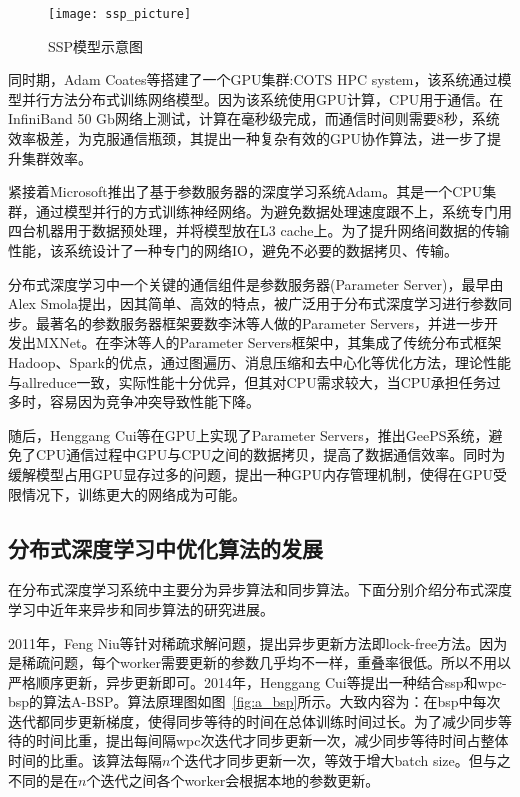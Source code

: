 \begin{figure}[htp]
\centering
\texttt{[image: ssp\_picture]}
\caption{SSP模型示意图}
\label{fig:ssp_picture}
\end{figure}
同时期，Adam Coates等搭建了一个GPU集群:COTS HPC system，该系统通过模型并行方法分布式训练网络模型。因为该系统使用GPU计算，CPU用于通信。在InfiniBand 50 Gb网络上测试，计算在毫秒级完成，而通信时间则需要8秒，系统效率极差，为克服通信瓶颈，其提出一种复杂有效的GPU协作算法，进一步了提升集群效率。

紧接着Microsoft推出了基于参数服务器的深度学习系统Adam。其是一个CPU集群，通过模型并行的方式训练神经网络。为避免数据处理速度跟不上，系统专门用四台机器用于数据预处理，并将模型放在L3 cache上。为了提升网络间数据的传输性能，该系统设计了一种专门的网络IO，避免不必要的数据拷贝、传输。

分布式深度学习中一个关键的通信组件是参数服务器(Parameter Server)，最早由Alex Smola提出，因其简单、高效的特点，被广泛用于分布式深度学习进行参数同步。最著名的参数服务器框架要数李沐等人做的Parameter Servers，并进一步开发出MXNet。在李沐等人的Parameter Servers框架中，其集成了传统分布式框架Hadoop、Spark的优点，通过图遍历、消息压缩和去中心化等优化方法，理论性能与allreduce一致，实际性能十分优异，但其对CPU需求较大，当CPU承担任务过多时，容易因为竞争冲突导致性能下降。

随后，Henggang Cui等在GPU上实现了Parameter Servers，推出GeePS系统，避免了CPU通信过程中GPU与CPU之间的数据拷贝，提高了数据通信效率。同时为缓解模型占用GPU显存过多的问题，提出一种GPU内存管理机制，使得在GPU受限情况下，训练更大的网络成为可能。
\subsection{分布式深度学习中优化算法的发展}
在分布式深度学习系统中主要分为异步算法和同步算法。下面分别介绍分布式深度学习中近年来异步和同步算法的研究进展。

2011年，Feng Niu等针对稀疏求解问题，提出异步更新方法即lock-free方法。因为是稀疏问题，每个worker需要更新的参数几乎均不一样，重叠率很低。所以不用以严格顺序更新，异步更新即可。2014年，Henggang Cui等提出一种结合ssp和wpc-bsp的算法A-BSP。算法原理图如图~\ref{fig:a_bsp}所示。大致内容为：在bsp中每次迭代都同步更新梯度，使得同步等待的时间在总体训练时间过长。为了减少同步等待的时间比重，提出每间隔wpc次迭代才同步更新一次，减少同步等待时间占整体时间的比重。该算法每隔$n$个迭代才同步更新一次，等效于增大batch size。但与之不同的是在$n$个迭代之间各个worker会根据本地的参数更新。

